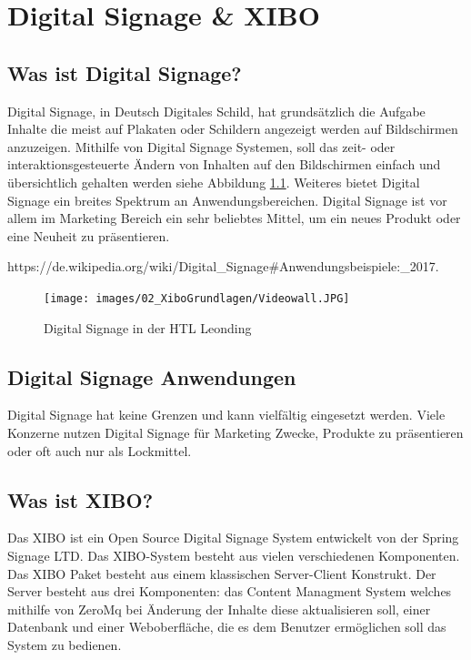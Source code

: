 \chapter{Digital Signage & XIBO}
\section{Was ist Digital Signage?}\label{sec:digitalsignage}
Digital Signage, in Deutsch Digitales Schild, hat grundsätzlich die Aufgabe Inhalte die meist auf Plakaten oder Schildern angezeigt werden auf Bildschirmen anzuzeigen. Mithilfe von Digital Signage Systemen, soll das zeit- oder interaktionsgesteuerte Ändern von Inhalten auf den Bildschirmen einfach und übersichtlich gehalten werden siehe Abbildung \ref{img:digitalsignagehtlleonding}. Weiteres bietet Digital Signage ein breites Spektrum an Anwendungsbereichen. Digital Signage ist vor allem im Marketing Bereich ein sehr beliebtes Mittel, um ein neues Produkt oder eine Neuheit zu präsentieren. 

https://de.wikipedia.org/wiki/Digital_Signage#Anwendungsbeispiele:_2017.


\begin{figure}[H]
\centering
\texttt{[image: images/02\_XiboGrundlagen/Videowall.JPG]}
\caption{Digital Signage in der HTL Leonding}
\label{img:digitalsignagehtlleonding}
\end{figure}

\section{Digital Signage Anwendungen}\label{sec:anwendungedigitalsignage}
Digital Signage hat keine Grenzen und kann vielfältig eingesetzt werden. Viele Konzerne nutzen Digital Signage für Marketing Zwecke, Produkte zu präsentieren oder oft auch nur als Lockmittel.

\section{Was ist XIBO?}\label{sec:xibo}
Das XIBO ist ein Open Source Digital Signage System entwickelt von der Spring Signage LTD. Das XIBO-System besteht aus vielen verschiedenen Komponenten. Das XIBO Paket besteht aus einem klassischen Server-Client Konstrukt. Der Server besteht aus drei Komponenten: das Content Managment System welches mithilfe von ZeroMq bei Änderung der Inhalte diese aktualisieren soll, einer Datenbank und einer Weboberfläche, die es dem Benutzer ermöglichen soll das System zu bedienen.

